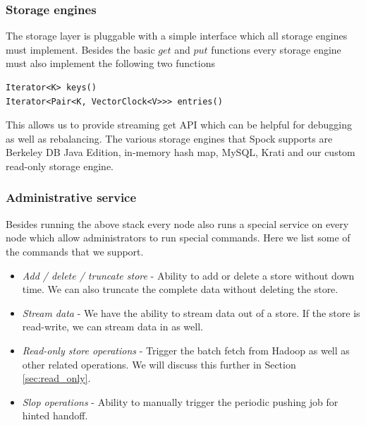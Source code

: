 \documentclass[twocolumn]{article}
\newcommand{\projectname}{Spock}
\begin{document}

\subsubsection {Storage engines}
\label{sec:system_architecture:system_components:storage_engine}

The storage layer is pluggable with a simple interface which all storage engines must implement. Besides the basic $get$ and $put$ functions every storage engine must also implement the following two functions 

\scriptsize
\begin{verbatim}
Iterator<K> keys() 
Iterator<Pair<K, VectorClock<V>>> entries()
\end{verbatim}  
\normalsize

This allows us to provide streaming get API which can be helpful for debugging as well as rebalancing. The various storage engines that \projectname{} supports are Berkeley DB Java Edition, in-memory hash map, MySQL, Krati and our custom read-only storage engine. 


\subsubsection{Administrative service}
\label{sec:system_architecture:system_components:admin_service}

Besides running the above stack every node also runs a special service on every node which allow administrators to run special commands. Here we list some of the commands that we support.

\begin{itemize}
	
	\item \emph{Add / delete / truncate store} - Ability to add or delete a store without down time. We can also truncate the complete data without deleting the store. 
	\item \emph{Stream data} - We have the ability to stream data out of a store. If the store is read-write, we can stream data in as well. 
	\item \emph{Read-only store operations} - Trigger the batch fetch from Hadoop as well as other related operations. We will discuss this further in Section \ref{sec:read_only}. 
	\item \emph{Slop operations} - Ability to manually trigger the periodic pushing job for hinted handoff. 
	
\end{itemize}
\end{document}
